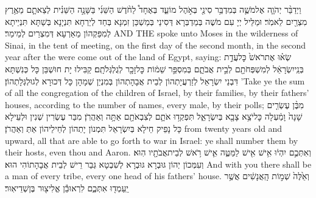 {וַיְדַבֵּ֨ר יְהֹוָ֧ה אֶל\maqqaf מֹשֶׁ֛ה בְּמִדְבַּ֥ר סִינַ֖י בְּאֹ֣הֶל מוֹעֵ֑ד בְּאֶחָד֩ לַחֹ֨דֶשׁ הַשֵּׁנִ֜י בַּשָּׁנָ֣ה הַשֵּׁנִ֗ית לְצֵאתָ֛ם מֵאֶ֥רֶץ מִצְרַ֖יִם לֵאמֹֽר׃}
{וּמַלֵּיל יְיָ עִם מֹשֶׁה בְּמַדְבְּרָא דְּסִינַי בְּמַשְׁכַּן זִמְנָא בְּחַד לְיַרְחָא תִּנְיָנָא בְּשַׁתָּא תִּנְיֵיתָא לְמִפַּקְהוֹן מֵאַרְעָא דְּמִצְרַיִם לְמֵימַר׃}
{AND THE \lord\space spoke unto Moses in the wilderness of Sinai, in the tent of meeting, on the first day of the second month, in the second year after the were come out of the land of Egypt, saying:}{}
{שְׂא֗וּ אֶת\maqqaf רֹאשׁ֙ כׇּל\maqqaf עֲדַ֣ת בְּנֵֽי\maqqaf יִשְׂרָאֵ֔ל לְמִשְׁפְּחֹתָ֖ם לְבֵ֣ית אֲבֹתָ֑ם בְּמִסְפַּ֣ר שֵׁמ֔וֹת כׇּל\maqqaf זָכָ֖ר לְגֻלְגְּלֹתָֽם׃}
{קַבִּילוּ יָת חוּשְׁבַּן כָּל כְּנִשְׁתָּא דִּבְנֵי יִשְׂרָאֵל לְזַרְעֲיָתְהוֹן לְבֵית אֲבָהָתְהוֹן בְּמִנְיַן שְׁמָהָן כָּל דְּכוּרָא לְגוּלְגְּלָתְהוֹן׃}
{’Take ye the sum of all the congregation of the children of Israel, by their families, by their fathers’ houses, according to the number of names, every male, by their polls;}{}
{מִבֶּ֨ן עֶשְׂרִ֤ים שָׁנָה֙ וָמַ֔עְלָה כׇּל\maqqaf יֹצֵ֥א צָבָ֖א בְּיִשְׂרָאֵ֑ל תִּפְקְד֥וּ אֹתָ֛ם לְצִבְאֹתָ֖ם אַתָּ֥ה וְאַהֲרֹֽן׃}
{מִבַּר עֶשְׂרִין שְׁנִין וּלְעֵילָא כָּל נָפֵיק חֵילָא בְּיִשְׂרָאֵל תִּמְנוֹן יָתְהוֹן לְחֵילֵיהוֹן אַתְּ וְאַהֲרֹן׃}
{from twenty years old and upward, all that are able to go forth to war in Israel: ye shall number them by their hosts, even thou and Aaron.}{}
{וְאִתְּכֶ֣ם יִהְי֔וּ אִ֥ישׁ אִ֖ישׁ לַמַּטֶּ֑ה אִ֛ישׁ רֹ֥אשׁ לְבֵית\maqqaf אֲבֹתָ֖יו הֽוּא׃}
{וְעִמְּכוֹן יְהוֹן גּוּבְרָא גּוּבְרָא לְשִׁבְטָא גְּבַר רֵישׁ לְבֵית אֲבָהָתוֹהִי הוּא׃}
{And with you there shall be a man of every tribe, every one head of his fathers’ house.}{}
{וְאֵ֙לֶּה֙ שְׁמ֣וֹת הָֽאֲנָשִׁ֔ים אֲשֶׁ֥ר יַֽעַמְד֖וּ אִתְּכֶ֑ם לִרְאוּבֵ֕ן אֱלִיצ֖וּר בֶּן\maqqaf שְׁדֵיאֽוּר׃}
